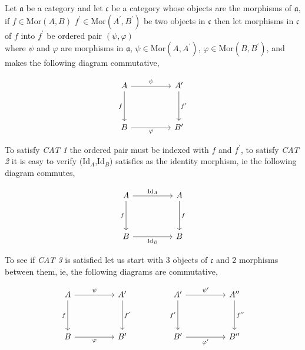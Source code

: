 \documentclass[11pt,a4paper]{colorart}
\def\mab{\mathfrak}
\begin{document}
Let $\mab{a}$ be a category and let $\mab{c}$ be a category whose objects are the morphisms of $\mab{a}$, if $f \in \text{Mor}(A,B)$ $f^\prime \in \text{Mor}(A^\prime,B^\prime)$ be two objects in $\mab{c}$ then let morphisms in $\mab{c}$ of $f$ into $f^\prime$ be ordered pair $(\psi, \varphi)$\\

where $\psi$ and $\varphi$ are morphisms in $\mab{a}$, $\psi \in \text{Mor}(A,A^\prime)$, $\varphi \in \text{Mor}(B,B^\prime)$, and makes the following diagram commutative,

\[\begin{tikzcd}
	A && {A^\prime} \\
	\\
	B && {B^\prime}
	\arrow["f"', from=1-1, to=3-1]
	\arrow["{f^\prime}", from=1-3, to=3-3]
	\arrow["\psi", from=1-1, to=1-3]
	\arrow["\varphi"', from=3-1, to=3-3]
\end{tikzcd}\]

To satisfy \textit{CAT 1} the ordered pair must be indexed with $f$ and $f^\prime$, to satisfy \textit{CAT 2} it is easy to verify $($Id$_A$,Id$_B)$ satisfies as the identity morphism, ie the following diagram commutes,

\[\begin{tikzcd}
	A && {A} \\
	\\
	B && {B}
	\arrow["f"', from=1-1, to=3-1]
	\arrow["{f}", from=1-3, to=3-3]
	\arrow["{\text{Id}_A}", from=1-1, to=1-3]
	\arrow["{\text{Id}_B}"', from=3-1, to=3-3]
\end{tikzcd}\]

To see if \textit{CAT 3} is satisfied let us start with 3 objects of $\mab{c}$ and 2 morphisms between them, ie, the following diagrams are commutative,

\[\begin{tikzcd}
	A && {A^\prime} && {A^\prime} && {A^{\prime\prime}} \\
	\\
	B && {B^\prime} && {B^\prime} && {B^{\prime\prime}}
	\arrow["f"', from=1-1, to=3-1]
	\arrow["{f^\prime}", from=1-3, to=3-3]
	\arrow["\psi", from=1-1, to=1-3]
	\arrow["\varphi"', from=3-1, to=3-3]
	\arrow["{f^\prime}"', from=1-5, to=3-5]
	\arrow["{f^{\prime\prime}}", from=1-7, to=3-7]
	\arrow["{\psi^\prime}", from=1-5, to=1-7]
	\arrow["{\varphi^\prime}"', from=3-5, to=3-7]
\end{tikzcd}\]
\end{document}
